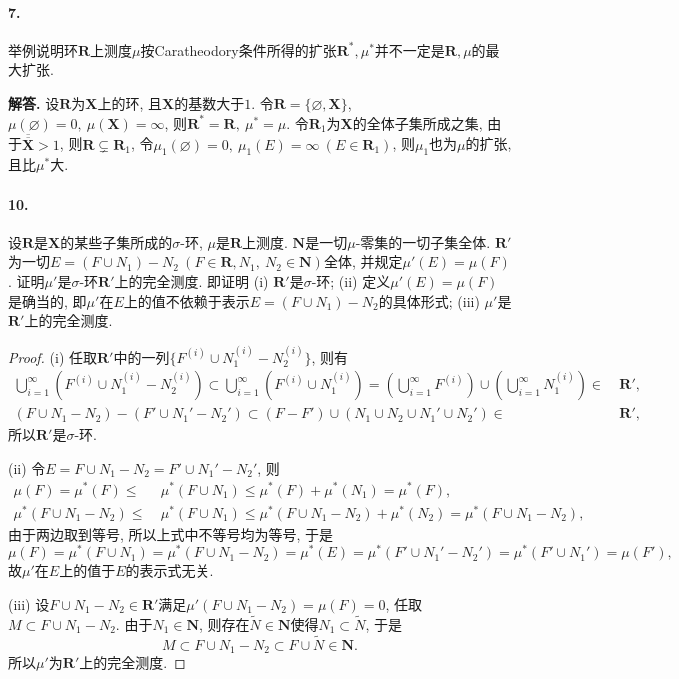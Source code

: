 \documentclass[12pt, a4paper, oneside]{ctexart}
\newenvironment{solution}{\par\noindent\textbf{解答. }}{\bigskip\par}
\let\leq=\leqslant %
\def\bd{\boldsymbol}    %
\def\wtd{\widetilde}    %
\def\ol{\overline}      %
\def\del{\vspace{-2.5ex}}  %
\begin{document}
\paragraph{7.}举例说明环$\bd{R}$上测度$\mu$按Caratheodory条件所得的扩张$\bd{R}^*, \mu^*$并不一定是$\bd{R},\mu$的最大扩张.
\begin{solution}
    设$\bd{R}$为$\bd{X}$上的环, 且$\bd{X}$的基数大于$1$. 令$\bd{R} = \{\varnothing, \bd{X}\}$, $\mu(\varnothing) = 0,\ \mu(\bd{X}) = \infty$, 则$\bd{R}^* = \bd{R},\ \mu^* = \mu$. 令$\bd{R}_1$为$\bd{X}$的全体子集所成之集, 由于$\ol{\ol{\bd{X}}}>1$, 则$\bd{R}\subsetneq \bd{R}_1$, 令$\mu_1(\varnothing) = 0,\ \mu_1(E) = \infty\ (E\in \bd{R}_1)$, 则$\mu_1$也为$\mu$的扩张, 且比$\mu^*$大.
\end{solution}\del

\paragraph{10.}设$\bd{R}$是$\bd{X}$的某些子集所成的$\sigma$-环, $\mu$是$\bd{R}$上测度. $\bd{N}$是一切$\mu$-零集的一切子集全体. $\bd{R}'$为一切$E = (F\cup N_1)-N_2\ (F\in \bd{R}, N_1,\ N_2\in \bd{N})$全体, 并规定$\mu'(E) = \mu(F)$. 证明$\mu'$是$\sigma$-环$\bd{R}'$上的完全测度. 即证明 (i) $\bd{R}'$是$\sigma$-环; (ii) 定义$\mu'(E) = \mu(F)$是确当的, 即$\mu'$在$E$上的值不依赖于表示$E = (F\cup N_1) - N_2$的具体形式; (iii) $\mu'$是$\bd{R}'$上的完全测度.
\begin{proof}
    (i) 任取$\bd{R}'$中的一列$\{F^{(i)}\cup N_1^{(i)}-N_2^{(i)}\}$, 则有
    \begin{align*}
        \bigcup_{i=1}^\infty\left(F^{(i)}\cup N_1^{(i)}-N_2^{(i)}\right)\subset \bigcup_{i=1}^\infty\left(F^{(i)}\cup N_1^{(i)}\right) = \left(\bigcup_{i=1}^\infty F^{(i)}\right)\cup\left(\bigcup_{i=1}^\infty N_1^{(i)}\right)\in&\ \bd{R}',\\
        (F\cup N_1-N_2) - (F'\cup N_1' - N_2')\subset (F-F')\cup(N_1\cup N_2\cup N_1'\cup N_2')\in&\ \bd{R}',
    \end{align*}
    所以$\bd{R}'$是$\sigma$-环.

    (ii) 令$E = F\cup N_1-N_2 = F'\cup N_1' - N_2'$, 则
    \begin{align*}
        \mu(F) = \mu^*(F)\leq&\ \mu^*(F\cup N_1)\leq\mu^*(F) + \mu^*(N_1) = \mu^*(F),\\
        \mu^*(F\cup N_1-N_2)\leq&\ \mu^*(F\cup N_1)\leq\mu^*(F\cup N_1-N_2)+\mu^*(N_2)=\mu^*(F\cup N_1-N_2),
    \end{align*}
    由于两边取到等号, 所以上式中不等号均为等号, 于是
    \begin{equation*}
        \mu(F) = \mu^*(F\cup N_1) = \mu^*(F\cup N_1-N_2) = \mu^*(E) = \mu^*(F'\cup N_1' - N_2') = \mu^*(F'\cup N_1') = \mu(F'),
    \end{equation*}
    故$\mu'$在$E$上的值于$E$的表示式无关.

    (iii) 设$F\cup N_1-N_2\in \bd{R}'$满足$\mu'(F\cup N_1-N_2) = \mu(F) = 0$, 任取$M\subset F\cup N_1-N_2$. 由于$N_1\in \bd{N}$, 则存在$\wtd{N}\in \bd{N}$使得$N_1\subset \wtd{N}$, 于是
    \begin{equation*}
        M\subset F\cup N_1-N_2\subset F\cup \wtd{N}\in \bd{N}.
    \end{equation*}
    所以$\mu'$为$\bd{R}'$上的完全测度.
\end{proof}
\end{document}
